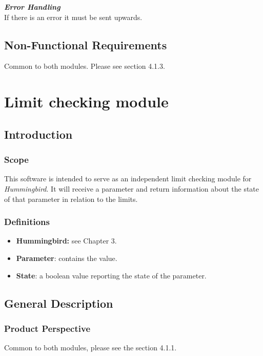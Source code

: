\textbf{\emph{Error Handling}}\\
If there is an error it must be sent upwards.\\

\pagebreak
\subsection{Non-Functional Requirements}

Common to both modules. Please see section 4.1.3.

\section{Limit checking module}

\subsection{Introduction}

\subsubsection{Scope}

This software is intended to serve as an independent limit checking module for \emph{Hummingbird}. It will receive a parameter and return information about the state of that parameter in relation to the limits.

\subsubsection{Definitions}

\begin{itemize}
\item \textbf{Hummingbird:} see Chapter 3.
\item \textbf{Parameter}: contains the value.
\item \textbf{State}: a boolean value reporting the state of the parameter.
\end{itemize}

\subsection{General Description}
\subsubsection{Product Perspective}

Common to both modules, please see the section 4.1.1.

